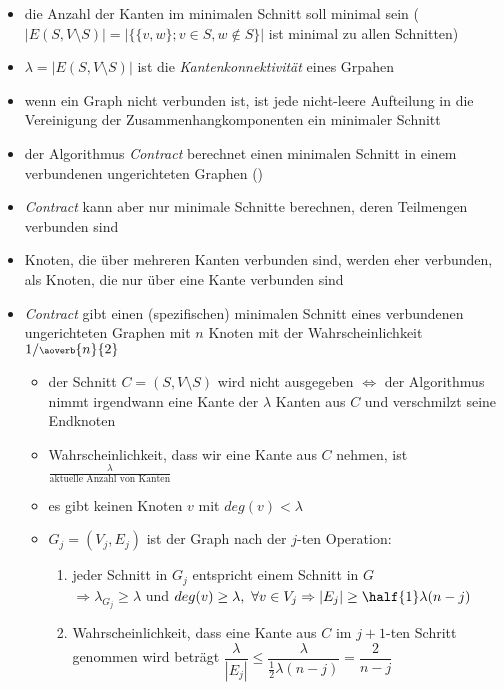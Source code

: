 \begin{itemize}[itemsep=-1pt]
	\item die Anzahl der Kanten im minimalen Schnitt soll minimal sein ($|E(S,V\setminus S)|=|\{\{v,w\};v\in S, w\notin S\}|$ ist minimal zu allen Schnitten)
	\item $\lambda = |E(S,V\setminus S)|$ ist die \textit{Kantenkonnektivität} eines Grpahen
	\item wenn ein Graph nicht verbunden ist, ist jede nicht-leere Aufteilung in die Vereinigung der Zusammenhangkomponenten ein minimaler Schnitt
	\item der Algorithmus \textit{Contract} berechnet einen minimalen Schnitt in einem verbundenen ungerichteten Graphen () %
	\item \textit{Contract} kann aber nur minimale Schnitte berechnen, deren Teilmengen verbunden sind
	\item Knoten, die über mehreren Kanten verbunden sind, werden eher verbunden, als Knoten, die nur über eine Kante verbunden sind
	\item \textit{Contract} gibt einen (spezifischen) minimalen Schnitt eines verbundenen ungerichteten Graphen mit $n$ Knoten mit der Wahrscheinlichkeit $1/\scriptsize{\aoverb{n}{2}}$
		\vspace*{-1.5\baselineskip}\Proof\up
			\begin{itemize}
				\item der Schnitt $C=(S,V\setminus S)$ wird nicht ausgegeben $\Longleftrightarrow$ der Algorithmus nimmt irgendwann eine Kante der $\lambda$ Kanten aus $C$ und verschmilzt seine Endknoten
				\item Wahrscheinlichkeit, dass wir eine Kante aus $C$ nehmen, ist $\frac{\lambda}{\text{aktuelle Anzahl von Kanten}}$
				\item es gibt keinen Knoten $v$ mit $deg(v)< \lambda$
				\item $G_j=(V_j,E_j)$ ist der Graph nach der $j$-ten Operation:
					\begin{enumerate}
						\item jeder Schnitt in $G_j$ entspricht einem Schnitt in $G$\\
						$\Rightarrow \lambda_{G_j} \geq \lambda$ und $deg(v)\geq \lambda,~\forall v\in V_j\\
						\Rightarrow |E_j| \geq \half{1}\lambda(n-j)$
						\item Wahrscheinlichkeit, dass eine Kante aus $C$ im $j+1$-ten Schritt genommen wird beträgt $\dfrac{\lambda}{|E_j|}\leq \dfrac{\lambda}{\frac{1}{2}\lambda(n-j)}=\dfrac{2}{n-j}$

\end{enumerate}
\end{itemize}
\end{itemize}

